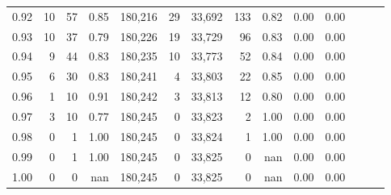 \begin{tabular}{rrrrrrrrrrrrrr}
0.92 &      10 &   57 &  0.85 &  180,216 &       29 &  33,692 &     133 &  0.82 &  0.00 &      0.00 \\
0.93 &      10 &   37 &  0.79 &  180,226 &       19 &  33,729 &      96 &  0.83 &  0.00 &      0.00 \\
0.94 &       9 &   44 &  0.83 &  180,235 &       10 &  33,773 &      52 &  0.84 &  0.00 &      0.00 \\
0.95 &       6 &   30 &  0.83 &  180,241 &        4 &  33,803 &      22 &  0.85 &  0.00 &      0.00 \\
0.96 &       1 &   10 &  0.91 &  180,242 &        3 &  33,813 &      12 &  0.80 &  0.00 &      0.00 \\
0.97 &       3 &   10 &  0.77 &  180,245 &        0 &  33,823 &       2 &  1.00 &  0.00 &      0.00 \\
0.98 &       0 &    1 &  1.00 &  180,245 &        0 &  33,824 &       1 &  1.00 &  0.00 &      0.00 \\
0.99 &       0 &    1 &  1.00 &  180,245 &        0 &  33,825 &       0 &   nan &  0.00 &      0.00 \\
1.00 &       0 &    0 &   nan &  180,245 &        0 &  33,825 &       0 &   nan &  0.00 &      0.00 \\
\bottomrule
\end{tabular}
